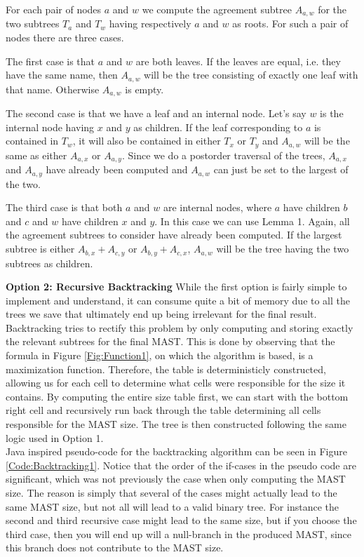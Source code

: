 For each pair of nodes $a$ and $w$ we compute the agreement subtree $A_{a,w}$ for the two subtrees $T_a$ and $T_w$ having respectively $a$ and $w$ as roots. For such a pair of nodes there are three cases.

The first case is that $a$ and $w$ are both leaves. If the leaves are equal, i.e. they have the same name, then $A_{a,w}$ will be the tree consisting of exactly one leaf with that name. Otherwise $A_{a,w}$ is empty.

The second case is that we have a leaf and an internal node. Let's say $w$ is the internal node having $x$ and $y$ as children. If the leaf corresponding to $a$ is contained in $T_w$, it will also be contained in either $T_x$ or $T_y$ and $A_{a,w}$ will be the same as either $A_{a,x}$ or $A_{a,y}$. Since we do a postorder traversal of the trees, $A_{a,x}$ and $A_{a,y}$ have already been computed and $A_{a,w}$ can just be set to the largest of the two.

The third case is that both $a$ and $w$ are internal nodes, where $a$ have children $b$ and $c$ and $w$ have children $x$ and $y$. In this case we can use Lemma 1. Again, all the agreement subtrees to consider have already been computed. If the largest subtree is either $A_{b,x} + A_{c,y}$ or $A_{b,y} + A_{c,x}$, $A_{a,w}$ will be the tree having the two subtrees as children.


\textbf{Option 2: Recursive Backtracking}
While the first option is fairly simple to implement and understand, it can consume quite a bit of memory due to all the trees we save that ultimately end up being irrelevant for the final result. Backtracking tries to rectify this problem by only computing and storing exactly the relevant subtrees for the final MAST. This is done by observing that the formula in Figure \ref{Fig:Function1}, on which the algorithm is based, is a maximization function. Therefore, the table is deterministicly constructed, allowing us for each cell to determine what cells were responsible for the size it contains. By computing the entire size table first, we can start with the bottom right cell and recursively run back through the table determining all cells responsible for the MAST size. The tree is then constructed following the same logic used in Option 1. 
\\
Java inspired pseudo-code for the backtracking algorithm can be seen in Figure \ref{Code:Backtracking1}. Notice that the order of the if-cases in the pseudo code are significant, which was not previously the case when only computing the MAST size. The reason is simply that several of the cases might actually lead to the same MAST size, but not all will lead to a valid binary tree. For instance the second and third recursive case might lead to the same size, but if you choose the third case, then you will end up will a null-branch in the produced MAST, since this branch does not contribute to the MAST size. 
    
